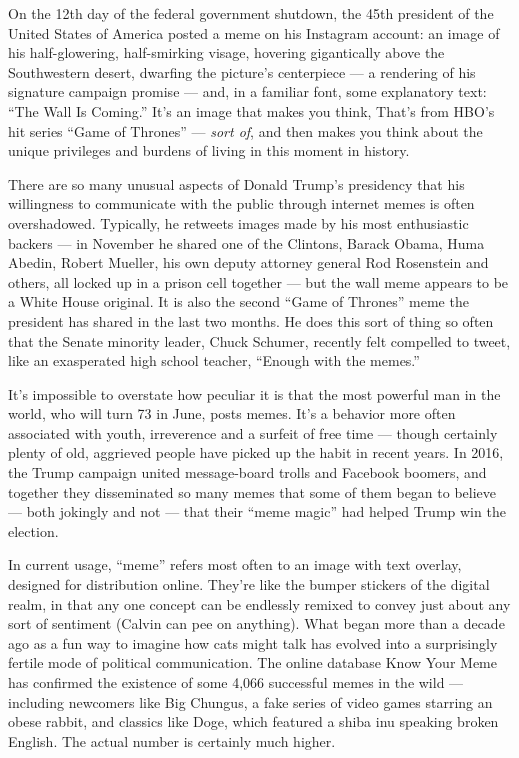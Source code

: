 On the 12th day of the federal government shutdown, the 45th president
of the United States of America posted a meme on his Instagram account:
an image of his half-glowering, half-smirking visage, hovering
gigantically above the Southwestern desert, dwarfing the picture's
centerpiece --- a rendering of his signature campaign promise --- and,
in a familiar font, some explanatory text: ``The Wall Is Coming.'' It's
an image that makes you think, That's from HBO's hit series ``Game of
Thrones'' --- \emph{sort of}, and then makes you think about the unique
privileges and burdens of living in this moment in history.

There are so many unusual aspects of Donald Trump's presidency that his
willingness to communicate with the public through internet memes is
often overshadowed. Typically, he retweets images made by his most
enthusiastic backers --- in November he shared one of the Clintons,
Barack Obama, Huma Abedin, Robert Mueller, his own deputy attorney
general Rod Rosenstein and others, all locked up in a prison cell
together --- but the wall meme appears to be a White House original. It
is also the second ``Game of Thrones'' meme the president has shared in
the last two months. He does this sort of thing so often that the Senate
minority leader, Chuck Schumer, recently felt compelled to tweet, like
an exasperated high school teacher, ``Enough with the memes.''

It's impossible to overstate how peculiar it is that the most powerful
man in the world, who will turn 73 in June, posts memes. It's a behavior
more often associated with youth, irreverence and a surfeit of free time
--- though certainly plenty of old, aggrieved people have picked up the
habit in recent years. In 2016, the Trump campaign united message-board
trolls and Facebook boomers, and together they disseminated so many
memes that some of them began to believe --- both jokingly and not ---
that their ``meme magic'' had helped Trump win the election.

In current usage, ``meme'' refers most often to an image with text
overlay, designed for distribution online. They're like the bumper
stickers of the digital realm, in that any one concept can be endlessly
remixed to convey just about any sort of sentiment (Calvin can pee on
anything). What began more than a decade ago as a fun way to imagine how
cats might talk has evolved into a surprisingly fertile mode of
political communication. The online database Know Your Meme has
confirmed the existence of some 4,066 successful memes in the wild ---
including newcomers like Big Chungus, a fake series of video games
starring an obese rabbit, and classics like Doge, which featured a shiba
inu speaking broken English. The actual number is certainly much higher.


